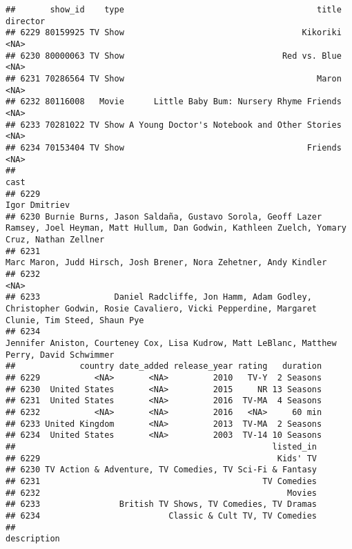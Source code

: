\documentclass[
]{article}
\begin{document}
\begin{verbatim}
##       show_id    type                                       title director
## 6229 80159925 TV Show                                    Kikoriki     <NA>
## 6230 80000063 TV Show                                Red vs. Blue     <NA>
## 6231 70286564 TV Show                                       Maron     <NA>
## 6232 80116008   Movie      Little Baby Bum: Nursery Rhyme Friends     <NA>
## 6233 70281022 TV Show A Young Doctor's Notebook and Other Stories     <NA>
## 6234 70153404 TV Show                                     Friends     <NA>
##                                                                                                                                                     cast
## 6229                                                                                                                                       Igor Dmitriev
## 6230 Burnie Burns, Jason Saldaña, Gustavo Sorola, Geoff Lazer Ramsey, Joel Heyman, Matt Hullum, Dan Godwin, Kathleen Zuelch, Yomary Cruz, Nathan Zellner
## 6231                                                                                   Marc Maron, Judd Hirsch, Josh Brener, Nora Zehetner, Andy Kindler
## 6232                                                                                                                                                <NA>
## 6233               Daniel Radcliffe, Jon Hamm, Adam Godley, Christopher Godwin, Rosie Cavaliero, Vicki Pepperdine, Margaret Clunie, Tim Steed, Shaun Pye
## 6234                                                          Jennifer Aniston, Courteney Cox, Lisa Kudrow, Matt LeBlanc, Matthew Perry, David Schwimmer
##             country date_added release_year rating   duration
## 6229           <NA>       <NA>         2010   TV-Y  2 Seasons
## 6230  United States       <NA>         2015     NR 13 Seasons
## 6231  United States       <NA>         2016  TV-MA  4 Seasons
## 6232           <NA>       <NA>         2016   <NA>     60 min
## 6233 United Kingdom       <NA>         2013  TV-MA  2 Seasons
## 6234  United States       <NA>         2003  TV-14 10 Seasons
##                                                    listed_in
## 6229                                                Kids' TV
## 6230 TV Action & Adventure, TV Comedies, TV Sci-Fi & Fantasy
## 6231                                             TV Comedies
## 6232                                                  Movies
## 6233                British TV Shows, TV Comedies, TV Dramas
## 6234                          Classic & Cult TV, TV Comedies
##                                                                                                                                                 description

\end{verbatim}
\end{document}
